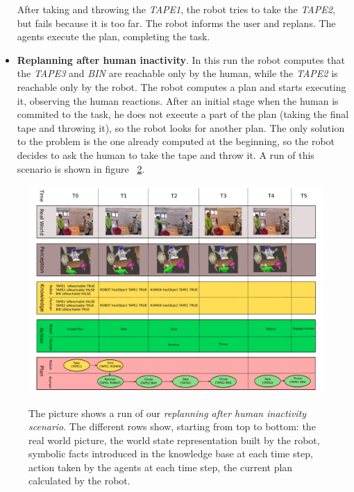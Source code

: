 \begin{itemize}
\begin{figure}
{      }
  \label{fig:case_study-helper-scenario3}
\end{figure}


After taking and throwing the \textit{TAPE1}, the robot tries to take the
\textit{TAPE2}, but fails because it is too far. The robot informs the user
and replans. The agents execute the plan, completing the task.

\item
\textbf{Replanning after human inactivity}.
In this run the robot computes that the \textit{TAPE3} and \textit{BIN}
are reachable only by the human, while the \textit{TAPE2} is reachable only by the robot. The robot computes a plan
and starts executing it, observing the human reactions. 
 After an initial stage when the human is
commited to the task, he does not execute a part of the plan (taking
the final tape and throwing it), so the robot looks for another
plan. The only solution to the problem is the one already computed at
the beginning, so the robot decides to ask
 the human to take the tape and throw it. A run of this
scenario is shown in figure ~\ref{fig:case_study-helper-experiment}. 
\end{itemize}

 
\begin{figure}
  \caption[Robot helper experiment 4]{The picture shows a run of our \textit{replanning after human
    inactivity scenario}. The different
    rows show, starting from top to bottom: the real world picture,
    the world state representation built by the robot, symbolic facts
    introduced in the knowledge base at each time step, action taken by the
    agents at each time step, the current plan calculated by the robot.}
  \centering
  \includegraphics[angle=90, scale=0.7]{img/case_study/helper/complete_plan.pdf}
  \label{fig:case_study-helper-experiment}

\end {figure}


